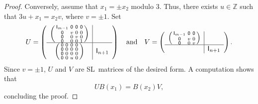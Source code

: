 \documentclass[12pt]{amsbook}%
\theoremstyle{defin}
\theoremstyle{remark}
\numberwithin{equation}{chapter}
\numberwithin{theor}{section}
\newcommand{\ZZ}{\mathbb{Z}}
\newcommand{\idmatrix}{\mathsf{I}}
\newcommand{\zmatrix}{\mathsf{0}}
\newcommand{\SL}{{\sf SL}}
\begin{document}
\begin{proof}
Conversely, assume that $x_1=\pm x_2$ modulo $3$.  Thus, there exists $u \in \ZZ$ such that $3u + x_1 = x_2 v$, where $v = \pm 1$.  Set 
$$
U=\left( \begin{array}{c|c}
\left( \begin{smallmatrix}
\idmatrix_{m-1} & \zmatrix & \zmatrix & \zmatrix \\
\zmatrix & v & 0  & 0 \\
\zmatrix & 0 & v & 0 \\
\zmatrix & 0 & 0 & 1
\end{smallmatrix}\right)
 \\ \hline
\left(\begin{smallmatrix}
\zmatrix & \zmatrix & \zmatrix & \zmatrix \\
\zmatrix & 0 & 0  & 0 \\
\zmatrix & 0 & 0 & 0 \\
\zmatrix & 0 & u & 0
\end{smallmatrix}\right)
&
\idmatrix_{n+1}
\end{array} 
\right) \quad \text{and} \quad 
V= 
\left( 
\begin{array}{c|c}
\left(
\begin{smallmatrix}
\idmatrix_{m-1} & \zmatrix & \zmatrix  \\
\zmatrix & v & 0  \\
\zmatrix & 0 & v  \\
\end{smallmatrix}\right)
& \\ \hline
	& \idmatrix_{n+1}
\end{array}
\right).
$$
Since $v = \pm 1$, $U$ and $V$ are \SL\ matrices of the desired form.  A computation shows that 
$$
U B(x_1) = B(x_2) V,
$$
concluding the proof.
\end{proof}
\end{document}
